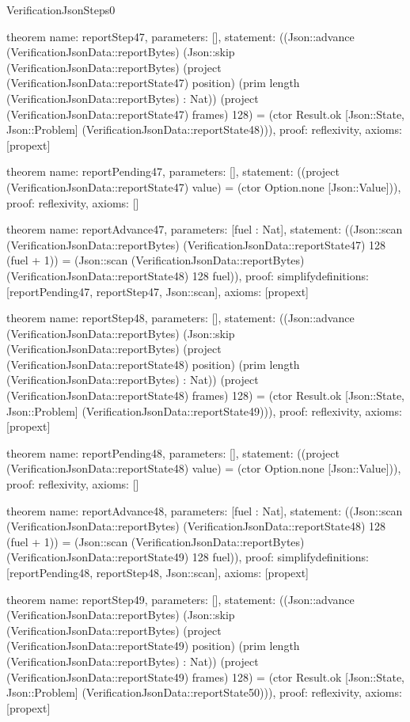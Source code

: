 \begin{lexlean}{VerificationJsonSteps0}
\begin{semanticmodule}
theorem{
  name: reportStep47,
  parameters: [],
  statement: ((Json::advance (VerificationJsonData::reportBytes) (Json::skip (VerificationJsonData::reportBytes) (project (VerificationJsonData::reportState47) position) (prim length (VerificationJsonData::reportBytes) : Nat)) (project (VerificationJsonData::reportState47) frames) 128) = (ctor Result.ok [Json::State, Json::Problem] (VerificationJsonData::reportState48))),
  proof: reflexivity{},
  axioms: [propext]
}

theorem{
  name: reportPending47,
  parameters: [],
  statement: ((project (VerificationJsonData::reportState47) value) = (ctor Option.none [Json::Value])),
  proof: reflexivity{},
  axioms: []
}

theorem{
  name: reportAdvance47,
  parameters: [fuel : Nat],
  statement: ((Json::scan (VerificationJsonData::reportBytes) (VerificationJsonData::reportState47) 128 (fuel + 1)) = (Json::scan (VerificationJsonData::reportBytes) (VerificationJsonData::reportState48) 128 fuel)),
  proof: simplify{definitions: [reportPending47, reportStep47, Json::scan]},
  axioms: [propext]
}

theorem{
  name: reportStep48,
  parameters: [],
  statement: ((Json::advance (VerificationJsonData::reportBytes) (Json::skip (VerificationJsonData::reportBytes) (project (VerificationJsonData::reportState48) position) (prim length (VerificationJsonData::reportBytes) : Nat)) (project (VerificationJsonData::reportState48) frames) 128) = (ctor Result.ok [Json::State, Json::Problem] (VerificationJsonData::reportState49))),
  proof: reflexivity{},
  axioms: [propext]
}

theorem{
  name: reportPending48,
  parameters: [],
  statement: ((project (VerificationJsonData::reportState48) value) = (ctor Option.none [Json::Value])),
  proof: reflexivity{},
  axioms: []
}

theorem{
  name: reportAdvance48,
  parameters: [fuel : Nat],
  statement: ((Json::scan (VerificationJsonData::reportBytes) (VerificationJsonData::reportState48) 128 (fuel + 1)) = (Json::scan (VerificationJsonData::reportBytes) (VerificationJsonData::reportState49) 128 fuel)),
  proof: simplify{definitions: [reportPending48, reportStep48, Json::scan]},
  axioms: [propext]
}

theorem{
  name: reportStep49,
  parameters: [],
  statement: ((Json::advance (VerificationJsonData::reportBytes) (Json::skip (VerificationJsonData::reportBytes) (project (VerificationJsonData::reportState49) position) (prim length (VerificationJsonData::reportBytes) : Nat)) (project (VerificationJsonData::reportState49) frames) 128) = (ctor Result.ok [Json::State, Json::Problem] (VerificationJsonData::reportState50))),
  proof: reflexivity{},
  axioms: [propext]
}


\end{semanticmodule}
\end{lexlean}
